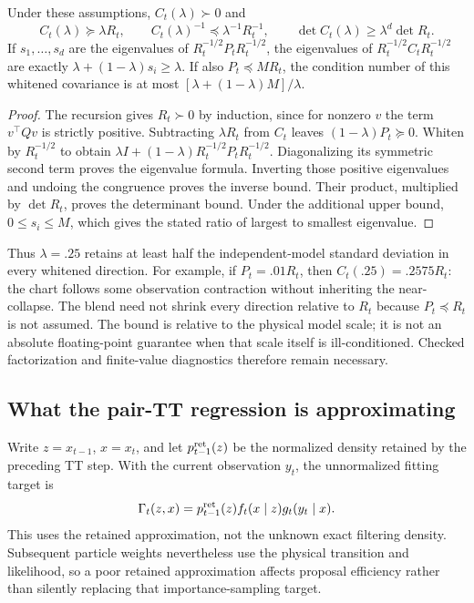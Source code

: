 \begin{proposition}
\label{prop:a11-floor}
Under these assumptions, $C_t(\lambda)\succ0$ and
\begin{equation}
 C_t(\lambda)\succeq\lambda R_t,\qquad
 C_t(\lambda)^{-1}\preceq\lambda^{-1}R_t^{-1},\qquad
 \det C_t(\lambda)\ge\lambda^d\det R_t.
 \label{eq:a11-floor}
\end{equation}
If $s_1,\ldots,s_d$ are the eigenvalues of
$R_t^{-1/2}P_tR_t^{-1/2}$, the eigenvalues of
$R_t^{-1/2}C_tR_t^{-1/2}$ are exactly
$\lambda+(1-\lambda)s_i\ge\lambda$. If also $P_t\preceq M R_t$,
the condition number of this whitened covariance is at most
$[\lambda+(1-\lambda)M]/\lambda$.
\end{proposition}
\begin{proof}
The recursion gives $R_t\succ0$ by induction, since for nonzero $v$ the
term $v^\top Qv$ is strictly positive. Subtracting $\lambda R_t$ from
$C_t$ leaves $(1-\lambda)P_t\succeq0$. Whiten by $R_t^{-1/2}$ to obtain
$\lambda I+(1-\lambda)R_t^{-1/2}P_tR_t^{-1/2}$. Diagonalizing its
symmetric second term proves the eigenvalue formula. Inverting those
positive eigenvalues and undoing the congruence proves the inverse bound.
Their product, multiplied by $\det R_t$, proves the determinant bound.
Under the additional upper bound, $0\le s_i\le M$, which gives the
stated ratio of largest to smallest eigenvalue.
\end{proof}

Thus $\lambda=.25$ retains at least half the independent-model standard
deviation in every whitened direction. For example, if $P_t=.01R_t$,
then $C_t(.25)=.2575R_t$: the chart follows some observation contraction
without inheriting the near-collapse. The blend need not shrink every
direction relative to $R_t$ because $P_t\preceq R_t$ is not assumed.
The bound is relative to the physical model scale; it is not an absolute
floating-point guarantee when that scale itself is ill-conditioned. Checked
factorization and finite-value diagnostics therefore remain necessary.

\subsection{What the pair-TT regression is approximating}

Write $z=x_{t-1}$, $x=x_t$, and let $p_{t-1}^{\rm ret}(z)$ be the
normalized density retained by the preceding TT step. With the current
observation $y_t$, the unnormalized fitting target is
\begin{equation}
 \Gamma_t(z,x)=p_{t-1}^{\rm ret}(z)f_t(x\mid z)g_t(y_t\mid x).
 \label{eq:a11-target}
\end{equation}
This uses the retained approximation, not the unknown exact filtering
density. Subsequent particle weights nevertheless use the physical
transition and likelihood, so a poor retained approximation affects proposal
efficiency rather than silently replacing that importance-sampling target.

